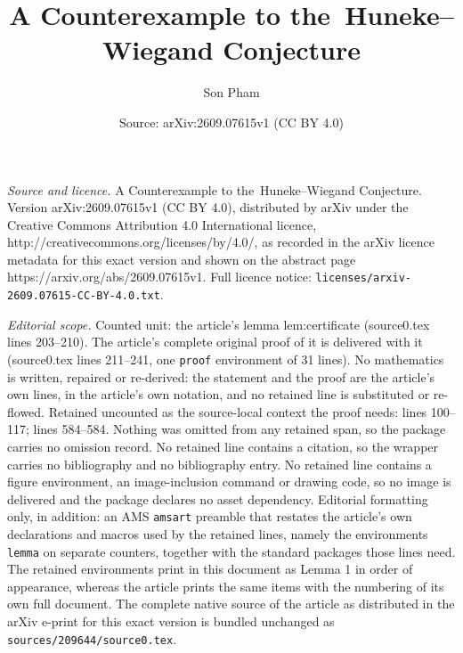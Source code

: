 \documentclass[10pt,a4paper]{amsart}
\title{A Counterexample to the\ Huneke--Wiegand Conjecture}
\author{Son Pham}
\date{Source: arXiv:2609.07615v1 (CC BY 4.0)}
\begin{document}
\maketitle

\noindent\emph{Source and licence.} A Counterexample to the\ Huneke--Wiegand Conjecture. Version arXiv:2609.07615v1 (CC BY 4.0), distributed by arXiv under the Creative Commons Attribution 4.0 International licence, http://creativecommons.org/licenses/by/4.0/, as recorded in the arXiv licence metadata for this exact version and shown on the abstract page https://arxiv.org/abs/2609.07615v1. Full licence notice: \texttt{licenses/arxiv-2609.07615-CC-BY-4.0.txt}.\par\smallskip

\noindent\textit{Editorial scope.} Counted unit: the article's lemma lem:certificate (source0.tex lines 203--210). The article's complete original proof of it is delivered with it (source0.tex lines 211--241, one \texttt{proof} environment of 31 lines). No mathematics is written, repaired or re-derived: the statement and the proof are the article's own lines, in the article's own notation, and no retained line is substituted or re-flowed.  Retained uncounted as the source-local context the proof needs: lines 100--117; lines 584--584.  Nothing was omitted from any retained span, so the package carries no omission record.  No retained line contains a citation, so the wrapper carries no bibliography and no bibliography entry.  No retained line contains a figure environment, an image-inclusion command or drawing code, so no image is delivered and the package declares no asset dependency.  Editorial formatting only, in addition: an AMS \texttt{amsart} preamble that restates the article's own declarations and macros used by the retained lines, namely the environments \texttt{lemma} on separate counters, together with the standard packages those lines need.  The retained environments print in this document as Lemma 1 in order of appearance, whereas the article prints the same items with the numbering of its own full document.  The complete native source of the article as distributed in the arXiv e-print for this exact version is bundled unchanged as \texttt{sources/209644/source0.tex}.
\end{document}

